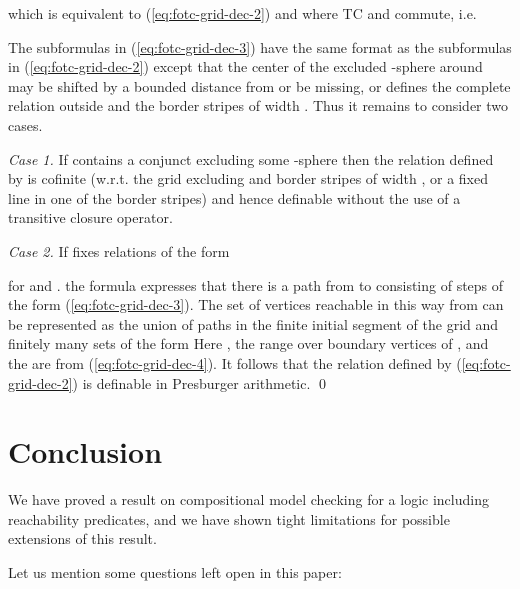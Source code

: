 \documentclass{LMCS}
\begin{document}
{which is equivalent to (\ref{eq:fotc-grid-dec-2}) and where TC and  commute, i.e.

 
The subformulas  in (\ref{eq:fotc-grid-dec-3}) have the same format as  
the subformulas  in (\ref{eq:fotc-grid-dec-2}) except that the center of 
the excluded -sphere around  may be shifted by a bounded distance 
from  or be missing, or  defines the complete relation 
outside  and the border stripes of width .
Thus it remains to consider two cases.

\noindent \emph{Case 1.}  If  contains a conjunct 
excluding some -sphere then the relation defined by  
is cofinite (w.r.t. the grid excluding  and border stripes of width , or a fixed line in one of the border stripes) 
and hence definable without the use of a transitive closure operator.

\noindent\emph{Case 2.} If   fixes relations of the form

for   and .
the formula   
expresses that there is a path from  to  consisting of steps of the form 
(\ref{eq:fotc-grid-dec-3}). The set of vertices  reachable in this way from  
can be represented as the union of paths in the finite initial segment  of the grid 
and finitely many sets of the form 
Here , the  range over boundary vertices of , 
and the  are from  (\ref{eq:fotc-grid-dec-4}). It follows that 
the relation defined by (\ref{eq:fotc-grid-dec-2}) is definable in Presburger arithmetic.
\qed






\section{Conclusion}













We have proved a result on compositional model checking for 
a logic including reachability predicates, and we have shown 
tight limitations for possible extensions of this result.

Let us mention some questions left open in this paper: 

}
\end{document}
